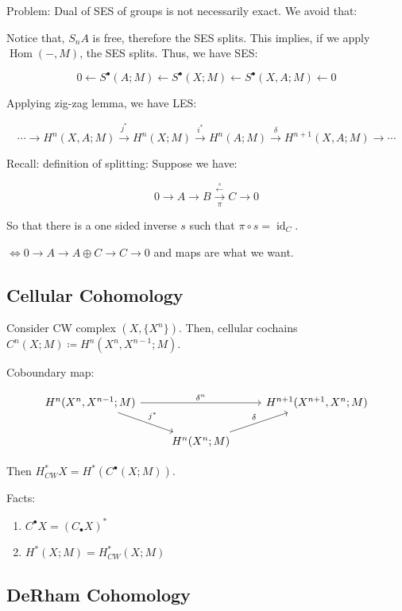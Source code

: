 \documentclass{article}
\theoremstyle{definition}
\begin{document}
    Problem: Dual of SES of groups is not necessarily exact. We avoid that:

    Notice that, \(S_n A\) is free, therefore the SES splits. This implies, if we apply \(\operatorname{Hom}(-,M)\), the SES splits. Thus, we have SES:

    \[
        0 \leftarrow S^\bullet(A;M) \leftarrow S^\bullet(X;M) \leftarrow S^\bullet(X,A;M) \leftarrow 0
    \]

    Applying zig-zag lemma, we have LES:

    \[
        \cdots \to H^n(X,A;M) \xrightarrow{j^{\ast}} H^n(X;M) \xrightarrow{i^{\ast}} H^n(A;M) \xrightarrow{\delta} H^{n+1} (X,A;M) \to \cdots
    \]

    Recall: definition of splitting: Suppose we have:

    \[
        0 \to A \to B \xrightarrow[\pi]{\overset{s}{\leftarrow}} C \to 0
    \]

    So that there is a one sided inverse \(s\) such that \(\pi \circ s = \operatorname{id}_{C}\).

    \(\iff 0 \to A \to A \oplus C \to C \to 0\) and maps are what we want.

    \subsection*{Cellular Cohomology}

    Consider CW complex \((X,\{ X^n \})\). Then, cellular cochains \(C^n(X;M) \coloneqq H^n(X^n, X^{n-1};M)\).

    Coboundary map:
    
    \[
        \begin{tikzcd}
            H^n(X^n, X^{n-1}; M) \ar[rr,"\delta^n"] \ar[rd, "j^{\ast}"] & & H^{n+1}(X^{n+1}, X^n; M) \\ & H^n(X^n;M) \ar[ru, "\delta"]
        \end{tikzcd}
    \]

    Then \(H^{\ast}_{CW} X = H^{\ast} (C^\bullet(X;M))\).
    
    Facts:

    \begin{enumerate}[label=\roman*)]
        \item \(C^\bullet X = (C_\bullet X)^{\ast}\)
        \item \(H^{\ast} (X;M) = H^{\ast}_{CW} (X;M)\) 
    \end{enumerate} 

    \subsection*{DeRham Cohomology}
\end{document}
